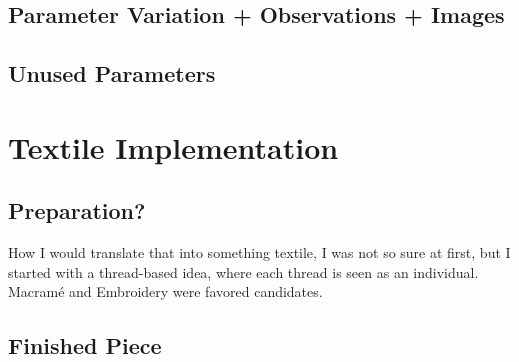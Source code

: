 \documentclass{scrartcl}
\begin{document}
\subsection{Parameter Variation + Observations + Images}

\subsection{Unused Parameters}


\section{Textile Implementation}

\subsection{Preparation?}
How I would translate that into something textile, I was not so sure at first, but I started with a thread-based idea, where each thread is seen as an individual. Macramé and Embroidery were favored candidates.

\subsection{}
\subsection{Finished Piece}

\section{}
\section{}
\subsection{}

\end{document}
